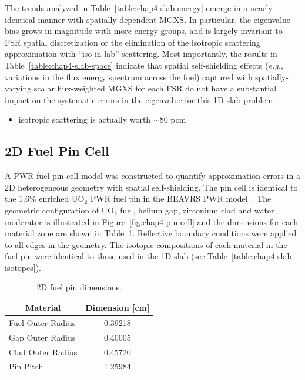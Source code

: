 The trends analyzed in Table~\ref{table:chap4-slab-energy} emerge in a nearly identical manner with spatially-dependent \ac{MGXS}. In particular, the eigenvalue bias grows in magnitude with more energy groups, and is largely invariant to \ac{FSR} spatial discretization or the elimination of the isotropic scattering approximation with ``iso-in-lab'' scattering. Most importantly, the results in Table~\ref{table:chap4-slab-space} indicate that spatial self-shielding effects (\textit{e.g.}, variations in the flux energy spectrum across the fuel) captured with spatially-varying scalar flux-weighted \ac{MGXS} for each \ac{FSR} do not have a substantial impact on the systematic errors in the eigenvalue for this 1D slab problem.

\begin{itemize}[noitemsep]
\item isotropic scattering is actually worth $\sim$80 pcm
\end{itemize}


\subsection{2D Fuel Pin Cell}
\label{subsec:chap4-pin}

A \ac{PWR} fuel pin cell model was constructed to quantify approximation errors in a 2D heterogeneous geometry with spatial self-shielding. The pin cell is identical to the 1.6\% enriched UO$_2$ \ac{PWR} fuel pin in the \ac{BEAVRS} \ac{PWR} model~\cite{horelik2013beavrs}. The geometric configuration of UO$_2$ fuel, helium gap, zirconium clad and water moderator is illustrated in Figure~\ref{fig:chap4-pin-cell} and the dimensions for each material zone are shown in Table~\ref{table:chap4-pin-dimensions}. Reflective boundary conditions were applied to all edges in the geometry. The isotopic compositions of each material in the fuel pin were identical to those used in the 1D slab (see Table~\ref{table:chap4-slab-isotopes}). 

\begin{table}[H]
  \centering
  \caption[2D fuel pin dimensions]{2D fuel pin dimensions.}
  \label{table:chap4-pin-dimensions} 
  \vspace{6pt}
  \begin{tabular}{l c}
  \toprule
  \multicolumn{1}{c}{\bf Material} &
  \multicolumn{1}{c}{\bf Dimension [cm]} \\
  \midrule
  Fuel Outer Radius &     0.39218 \\
  Gap Outer Radius &      0.40005 \\
  Clad Outer Radius &     0.45720 \\
  Pin Pitch &             1.25984 \\
  \bottomrule
\end{tabular}
\end{table}

